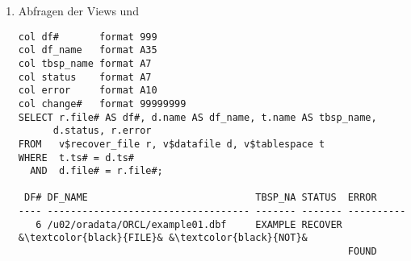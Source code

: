 \begin{enumerate}
\begin{enumerate}
\begin{lstlisting}[texcl=true, caption={Status der Datendateien abfragen mit V\$RECOVER\_FILE},label=admin1437,language=oracle_sql,emph={[10]FILE,OFFLINE,CHANGE, TIME, NOT},emphstyle={[10]\color{black}}]
&\textcolor{black}{FILE\#}& ERROR         ONLINE_ &\textcolor{black}{CHANGE\#}& &\textcolor{black}{TIME}& 
----- ------------------------------- ----------------- ------------------- -------
6    &\textcolor{black}{FILE}& &\textcolor{black}{NOT}& FOUND &\textcolor{black}{OFFLINE}&         0
              \end{lstlisting}
              Zusätzlich zu  zeigt sie an, dass eine Datendatei defekte Blöcke enthält. Im Gegensatz zu  kann sie nur dann verwendet werden, wenn die Kontrolldatei nicht wiederhergestellt werden musste.
\clearpage
            \item Abfragen der Views  und 
              \begin{lstlisting}[caption={Status der Datendateien abfragen},label=admin1438,language=oracle_sql,alsolanguage=sqlplus,emph={[9]FILE,OFFLINE,CHANGE, TIME, NOT},emphstyle={[9]\color{black}}]
col df#       format 999
col df_name   format A35
col tbsp_name format A7
col status    format A7
col error     format A10
col change#   format 99999999
SELECT r.file# AS df#, d.name AS df_name, t.name AS tbsp_name,
      d.status, r.error
FROM   v$recover_file r, v$datafile d, v$tablespace t
WHERE  t.ts# = d.ts#
  AND  d.file# = r.file#;

 DF# DF_NAME                             TBSP_NA STATUS  ERROR       
---- ----------------------------------- ------- ------- ----------
   6 /u02/oradata/ORCL/example01.dbf     EXAMPLE RECOVER &\textcolor{black}{FILE}& &\textcolor{black}{NOT}&
                                                         FOUND
              \end{lstlisting}
          \end{enumerate}
        \end{enumerate}
